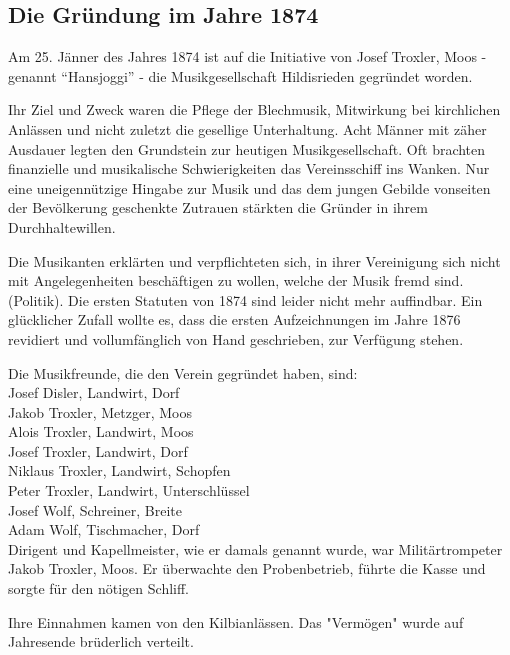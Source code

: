 \begin{history}

    \subsection{Die Gründung im Jahre 1874}

    Am 25. Jänner des Jahres 1874 ist auf die Initiative von Josef Troxler, Moos
    - genannt \enquote{Hansjoggi} - die Musikgesellschaft Hildisrieden gegründet
    worden.

    Ihr Ziel und Zweck waren die Pflege der Blechmusik, Mitwirkung bei
    kirchlichen Anlässen und nicht zuletzt die gesellige Unterhaltung. Acht
    Männer mit zäher Ausdauer legten den Grundstein zur heutigen
    Musikgesellschaft. Oft brachten finanzielle und musikalische Schwierigkeiten
    das Vereinsschiff ins Wanken. Nur eine uneigennützige Hingabe zur Musik und
    das dem jungen Gebilde vonseiten der Bevölkerung geschenkte Zutrauen
    stärkten die Gründer in ihrem Durchhaltewillen.

    Die Musikanten erklärten und verpflichteten sich, in ihrer Vereinigung sich
    nicht mit Angelegenheiten beschäftigen zu wollen, welche der Musik fremd
    sind. (Politik). Die ersten Statuten von 1874 sind leider nicht mehr
    auffindbar. Ein glücklicher Zufall wollte es, dass die ersten Aufzeichnungen
    im Jahre 1876 revidiert und vollumfänglich von Hand geschrieben, zur
    Verfügung stehen.

    Die Musikfreunde, die den Verein gegründet haben, sind:\\

    \noindent
    Josef Disler, Landwirt, Dorf\\
    Jakob Troxler, Metzger, Moos\\
    Alois Troxler, Landwirt, Moos\\
    Josef Troxler, Landwirt, Dorf\\
    Niklaus Troxler, Landwirt, Schopfen\\
    Peter Troxler, Landwirt, Unterschlüssel\\
    Josef Wolf, Schreiner, Breite\\
    Adam Wolf, Tischmacher, Dorf\\


    Dirigent und Kapellmeister, wie er damals genannt wurde, war
    Militärtrompeter Jakob Troxler, Moos. Er überwachte den Probenbetrieb,
    führte die Kasse und sorgte für den nötigen Schliff.

    Ihre Einnahmen kamen von den Kilbianlässen. Das "Vermögen" wurde auf
    Jahresende brüderlich verteilt.

\end{history}
